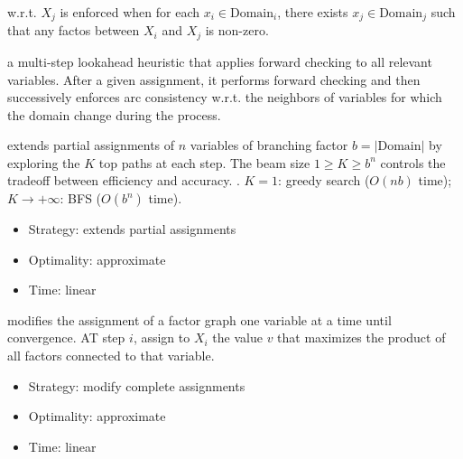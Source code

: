  w.r.t. $X_j$ is enforced when for each
$x_i \in \text{Domain}_i$, there exists $x_j \in \text{Domain}_j$ such that any
factos between $X_i$ and $X_j$ is non-zero.

 a multi-step lookahead heuristic that applies forward checking to all
relevant variables. After a given assignment, it performs forward checking and
then successively enforces arc consistency w.r.t. the neighbors of variables for
which the domain change during the process.

 extends partial assignments of $n$ variables of branching
factor $b = |\text{Domain}|$ by exploring the $K$ top paths at each step. The
beam size $1 \ge K \ge b^n$ controls the tradeoff between efficiency and
accuracy.
. $K=1$: greedy search ($O(nb)$ time); $K
\rightarrow +\infty$: BFS ($O(b^n)$ time).
\begin{itemize}
    \item Strategy: extends partial assignments
    \item Optimality: approximate
    \item Time: linear
\end{itemize}

 modifies the assignment of a
factor graph one variable at a time until convergence. AT step $i$, assign to
$X_i$ the value $v$ that maximizes the product of all factors connected to that
variable. 
\begin{itemize}
    \item Strategy: modify complete assignments
    \item Optimality: approximate
    \item Time: linear
\end{itemize}
